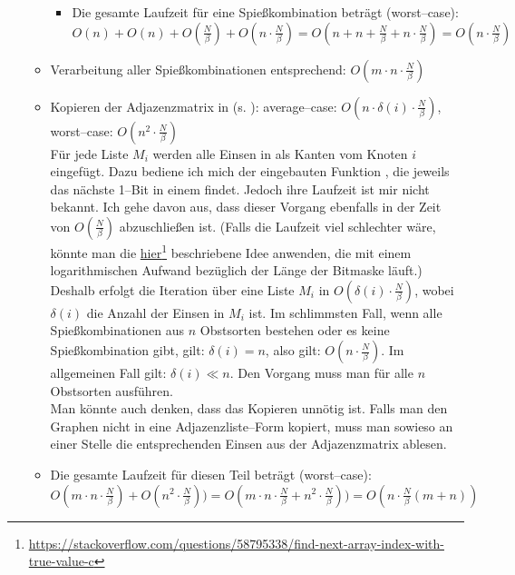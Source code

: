 \begin{itemize}
\begin{itemize}
\begin{itemize}
      \item Die gesamte Laufzeit für eine Spießkombination beträgt (worst--case):\\
      $O(n) + O(n) + O(\frac{N}{\beta}) + O(n \cdot\frac{N}{\beta}) 
      = O(n + n + \frac{N}{\beta} + n \cdot\frac{N}{\beta}) = O(n \cdot\frac{N}{\beta})$
    \end{itemize}

    \item Verarbeitung aller Spießkombinationen entsprechend: $O(m \cdot n \cdot\frac{N}{\beta})$

    \item Kopieren der Adjazenzmatrix in  (s. ): average--case: $O(n \cdot \delta(i) \cdot \frac{N}{\beta})$, worst--case: $O(n^2 \cdot \frac{N}{\beta})$ \\
    Für jede Liste $M_i$ werden alle Einsen in  als Kanten vom Knoten $i$ eingefügt.
    Dazu bediene ich mich der eingebauten Funktion ,
    die jeweils das nächste 1--Bit in einem  findet.
    Jedoch ihre Laufzeit ist mir nicht bekannt.
    Ich gehe davon aus, dass dieser Vorgang ebenfalls in der Zeit von $O(\frac{N}{\beta})$ abzuschließen ist. 
    (Falls die Laufzeit viel schlechter wäre, könnte man die \href{https://stackoverflow.com/questions/58795338/find-next-array-index-with-true-value-c}{hier}\footnote{\href{https://stackoverflow.com/questions/58795338/find-next-array-index-with-true-value-c}{https://stackoverflow.com/questions/58795338/find-next-array-index-with-true-value-c}} beschriebene Idee anwenden,
    die mit einem logarithmischen Aufwand bezüglich der Länge der Bitmaske läuft.)\\
    Deshalb erfolgt die Iteration über eine Liste $M_i$ in $O(\delta(i) \cdot \frac{N}{\beta})$, wobei
    $\delta(i)$ die Anzahl der Einsen in $M_i$ ist. Im schlimmsten Fall, wenn alle Spießkombinationen aus
    $n$ Obstsorten bestehen oder es keine Spießkombination gibt,
    gilt: $\delta(i) = n$, also gilt: $O(n \cdot \frac{N}{\beta})$.
    Im allgemeinen Fall gilt: $\delta(i) \ll n$. Den Vorgang muss man für alle $n$ Obstsorten
    ausführen.\\
    Man könnte auch denken, dass das Kopieren unnötig ist. Falls man den Graphen nicht
    in eine Adjazenzliste--Form kopiert,
    muss man sowieso an einer Stelle die entsprechenden Einsen aus der Adjazenzmatrix ablesen.

    \item Die gesamte Laufzeit für diesen Teil beträgt (worst--case):\\
    $O(m \cdot n \cdot\frac{N}{\beta}) + O(n^2 \cdot\frac{N}{\beta})) = 
    O(m \cdot n \cdot\frac{N}{\beta} + n^2 \cdot\frac{N}{\beta})) = O(n\cdot \frac{N}{\beta}(m + n))$ 
  \end{itemize}


\end{itemize}
